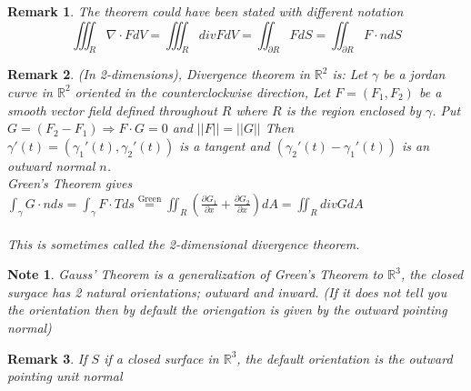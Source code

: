 \documentclass[12pt]{article}
\theoremstyle{plain}
\newtheorem*{remark}{Remark}
\newtheorem*{note}{Note}
\theoremstyle{definition}
\begin{document}
\begin{remark}
	The theorem could have been stated with different notation
	$$\iiint_R \nabla \cdot F dV = \iiint_R div F dV = \iint_{\partial R} F dS = \iint_{\partial R} F\cdot n dS$$
\end{remark}

\begin{remark}
	(In 2-dimensions), Divergence theorem in $\mathbb{R}^2$ is: Let $\gamma$ be a jordan curve in $\mathbb{R}^2$ oriented in the counterclockwise direction, Let $F = (F_1, F_2)$ be a smooth vector field defined throughout $R$ where $R$ is the region enclosed by $\gamma$. Put $G=(F_2 -F_1) \Longrightarrow F \cdot G = 0$ and $||F||=||G||$ Then $\gamma '(t) = (\gamma_1 '(t), \gamma_2 '(t))$ is a tangent and $(\gamma_2 '(t)-\gamma_1 '(t))$ is an outward normal $n$.\\
	Green's Theorem gives $\int_\gamma G \cdot n ds = \int_\gamma F \cdot T ds \overset{\text{Green}}{=} \iint_R (\frac{\partial G_1}{\partial x} + \frac{\partial G_2}{\partial x})dA = \iint_R div G dA$\\
	\\
	This is sometimes called the 2-dimensional divergence theorem.
\end{remark}

\begin{note}
	Gauss' Theorem is a generalization of Green's Theorem to $\mathbb{R}^3$, the closed surgace has 2 natural orientations; outward and inward. (If it does not tell you the orientation then by default the oriengation is given by the outward pointing normal)
\end{note}

\begin{remark}
	If $S$ if a closed surface in $\mathbb{R}^3$, the default orientation is the outward pointing unit normal
\end{remark}
\end{document}
